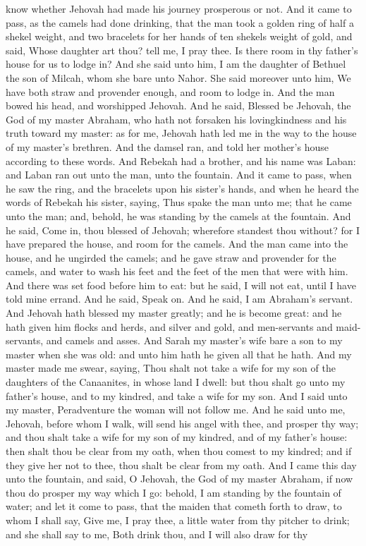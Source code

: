 know whether Jehovah had made his journey prosperous or not. And it came to pass, as the camels had done drinking, that the man took a golden ring of half a shekel weight, and two bracelets for her hands of ten shekels weight of gold, and said, Whose daughter art thou? tell me, I pray thee. Is there room in thy father’s house for us to lodge in? And she said unto him, I am the daughter of Bethuel the son of Milcah, whom she bare unto Nahor. She said moreover unto him, We have both straw and provender enough, and room to lodge in. And the man bowed his head, and worshipped Jehovah. And he said, Blessed be Jehovah, the God of my master Abraham, who hath not forsaken his lovingkindness and his truth toward my master: as for me, Jehovah hath led me in the way to the house of my master’s brethren.  And the damsel ran, and told her mother’s house according to these words. And Rebekah had a brother, and his name was Laban: and Laban ran out unto the man, unto the fountain. And it came to pass, when he saw the ring, and the bracelets upon his sister’s hands, and when he heard the words of Rebekah his sister, saying, Thus spake the man unto me; that he came unto the man; and, behold, he was standing by the camels at the fountain. And he said, Come in, thou blessed of Jehovah; wherefore standest thou without? for I have prepared the house, and room for the camels. And the man came into the house, and he ungirded the camels; and he gave straw and provender for the camels, and water to wash his feet and the feet of the men that were with him. And there was set food before him to eat: but he said, I will not eat, until I have told mine errand. And he said, Speak on. And he said, I am Abraham’s servant. And Jehovah hath blessed my master greatly; and he is become great: and he hath given him flocks and herds, and silver and gold, and men-servants and maid-servants, and camels and asses. And Sarah my master’s wife bare a son to my master when she was old: and unto him hath he given all that he hath. And my master made me swear, saying, Thou shalt not take a wife for my son of the daughters of the Canaanites, in whose land I dwell: but thou shalt go unto my father’s house, and to my kindred, and take a wife for my son. And I said unto my master, Peradventure the woman will not follow me. And he said unto me, Jehovah, before whom I walk, will send his angel with thee, and prosper thy way; and thou shalt take a wife for my son of my kindred, and of my father’s house: then shalt thou be clear from my oath, when thou comest to my kindred; and if they give her not to thee, thou shalt be clear from my oath. And I came this day unto the fountain, and said, O Jehovah, the God of my master Abraham, if now thou do prosper my way which I go: behold, I am standing by the fountain of water; and let it come to pass, that the maiden that cometh forth to draw, to whom I shall say, Give me, I pray thee, a little water from thy pitcher to drink; and she shall say to me, Both drink thou, and I will also draw for thy 